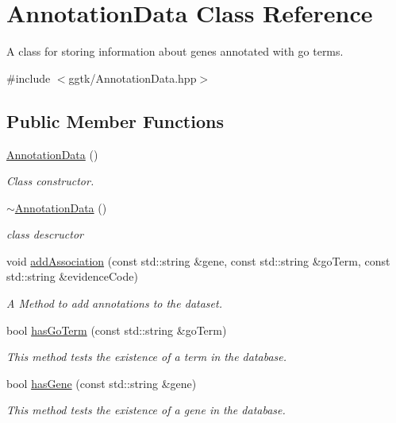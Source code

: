 \hypertarget{classAnnotationData}{}\section{Annotation\+Data Class Reference}
\label{classAnnotationData}


A class for storing information about genes annotated with go terms.  




{\ttfamily \#include $<$ggtk/\+Annotation\+Data.\+hpp$>$}

\subsection*{Public Member Functions}
\begin{DoxyCompactItemize}
\item 
\hyperlink{classAnnotationData_aa72d292d4f480d2e580ba4d39b88ab8f}{Annotation\+Data} ()
\begin{DoxyCompactList}\small\item\em Class constructor. \end{DoxyCompactList}\item 
\hyperlink{classAnnotationData_a3abda2766658360884f8097cf4ea5281}{$\sim$\+Annotation\+Data} ()
\begin{DoxyCompactList}\small\item\em class descructor \end{DoxyCompactList}\item 
void \hyperlink{classAnnotationData_ac6bd9048c83a52ebaa9a9e83a45e7f4a}{add\+Association} (const std\+::string \&gene, const std\+::string \&go\+Term, const std\+::string \&evidence\+Code)
\begin{DoxyCompactList}\small\item\em A Method to add annotations to the dataset. \end{DoxyCompactList}\item 
bool \hyperlink{classAnnotationData_a406a75a2f26bb7597f27599daf5416ad}{has\+Go\+Term} (const std\+::string \&go\+Term)
\begin{DoxyCompactList}\small\item\em This method tests the existence of a term in the database. \end{DoxyCompactList}\item 
bool \hyperlink{classAnnotationData_af1456f7623ce06262d8782a01fd2ca9c}{has\+Gene} (const std\+::string \&gene)
\begin{DoxyCompactList}\small\item\em This method tests the existence of a gene in the database. \end{DoxyCompactList}\item 

\end{DoxyCompactItemize}
